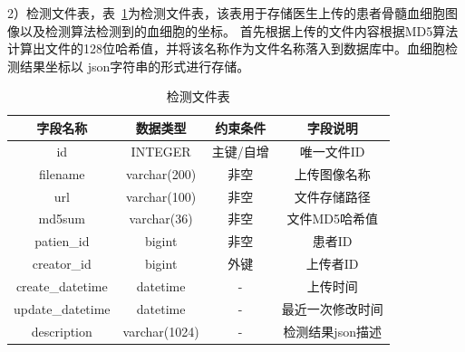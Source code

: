 2）检测文件表，表~\ref{table:detect_table}为检测文件表，该表用于存储医生上传的患者骨髓血细胞图像以及检测算法检测到的血细胞的坐标。
首先根据上传的文件内容根据MD5算法计算出文件的128位哈希值，并将该名称作为文件名称落入到数据库中。血细胞检测结果坐标以
json字符串的形式进行存储。
\begin{table}[htb]
    \caption{检测文件表}   
    \centering 
    \label{table:detect_table}
    \begin{tabular*}{0.9\hsize}{@{}@{\extracolsep{\fill}}cccc@{}}
      \toprule[1pt]
      字段名称  &  数据类型 & 约束条件 & 字段说明 \\
      \midrule[1pt] 
      id           & INTEGER      & 主键/自增    & 唯一文件ID   \\ 
      filename     & varchar(200) & 非空         & 上传图像名称   \\ 
      url          & varchar(100) & 非空         & 文件存储路径   \\ 
      md5sum       & varchar(36)  & 非空         & 文件MD5哈希值 \\
      patien\_id   & bigint       & 非空         & 患者ID  \\ 
      creator\_id  & bigint       & 外键         & 上传者ID  \\ 
      create\_datetime & datetime & -    & 上传时间 \\
      update\_datetime & datetime & -    & 最近一次修改时间 \\
      description      & varchar(1024) & - & 检测结果json描述 \\
      \bottomrule[1pt]      
    \end{tabular*} 
  \end{table}


